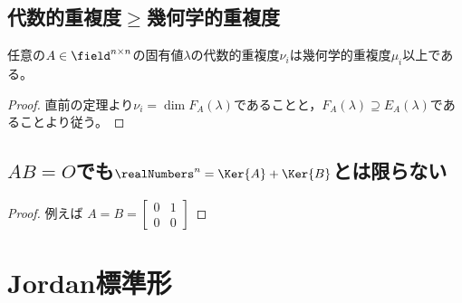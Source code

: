         \subsection{代数的重複度\texorpdfstring{$\geq$}{≧}幾何学的重複度}
            \begin{shadebox}
                任意の$A\in\field^{n\times n}$の固有値$\lambda$の代数的重複度$\nu_i$は幾何学的重複度$\mu_i$以上である。
            \end{shadebox}
            \begin{proof}
                直前の定理より$\nu_i = \dim{F_A(\lambda)}$であることと，$F_A(\lambda) \supseteq E_A(\lambda)$であることより従う。
            \end{proof}
        \subsection{\texorpdfstring{$AB=O$}{AB=O}でも\texorpdfstring{$\realNumbers^n = \Ker{A} + \Ker{B}$}{R\string^n = Ker(A) + Ker(B)}とは限らない}
            \begin{proof}
                例えば
                $
                    A=B=
                    \begin{bmatrix}
                        0 & 1 \\
                        0 & 0
                    \end{bmatrix}
                $
            \end{proof}
    \section{Jordan標準形}
